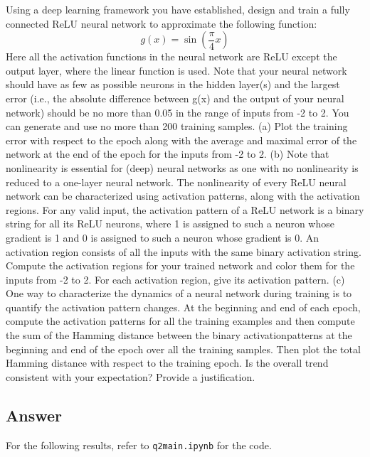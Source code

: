 \documentclass[
	12pt, %
]{../Template/fphw}
\begin{document}
\begin{problem}
Using a deep learning framework you have established, design and train a fully connected
ReLU neural network to approximate the following function:
\begin{equation}
    g(x) = \sin\left(\frac{\pi}{4}x\right)
\end{equation}
Here all the activation functions in the neural network are ReLU except the output layer, where the linear function
is used. Note that your neural network should have as few as possible neurons in the hidden layer(s) and the
largest error (i.e., the absolute difference between g(x) and the output of your neural network) should be no more
than 0.05 in the range of inputs from -2 to 2. You can generate and use no more than 200 training samples.
(a) Plot the training error with respect to the epoch along with the average and maximal error of the network
at the end of the epoch for the inputs from -2 to 2.
(b) Note that nonlinearity is essential for (deep) neural networks as one with no nonlinearity is reduced to a
one-layer neural network. The nonlinearity of every ReLU neural network can be characterized using
activation patterns, along with the activation regions. For any valid input, the activation pattern of a ReLU
network is a binary string for all its ReLU neurons, where 1 is assigned to such a neuron whose gradient is
1 and 0 is assigned to such a neuron whose gradient is 0. An activation region consists of all the inputs
with the same binary activation string. Compute the activation regions for your trained network and color
them for the inputs from -2 to 2. For each activation region, give its activation pattern.
(c) One way to characterize the dynamics of a neural network during training is to quantify the activation
pattern changes. At the beginning and end of each epoch, compute the activation patterns for all the
training examples and then compute the sum of the Hamming distance between the binary activationpatterns at the beginning and end of the epoch over all the training samples. Then plot the total Hamming
distance with respect to the training epoch. Is the overall trend consistent with your expectation? Provide a
justification.
\end{problem}


\subsection*{Answer}
For the following results, refer to \verb|q2main.ipynb| for the code. 
\end{document}
